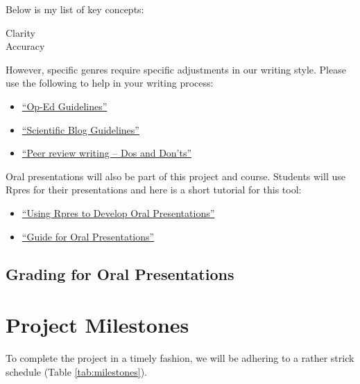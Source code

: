 \documentclass{article}\usepackage[]{graphicx}\usepackage[]{color}
\begin{document}
Below is my list of key concepts:

\begin{description}
  \item[Clarity]
  \item[Accuracy]
\end{description}


However, specific genres require specific adjustments in our writing style. Please use the following to help in your writing process:

\begin{itemize}
  \item \href{https://github.com/marclos/Climate_Change_Narratives/raw/master/Writing_Resources/Op-Ed_Guidelines.pdf}{``Op-Ed Guidelines''}
  \item \href{https://github.com/marclos/Climate_Change_Narratives/raw/master/Writing_Resources/Scientific_Blog_Guidelines.pdf}{``Scientific Blog Guidelines''}
  \item \href{https://github.com/marclos/Climate_Change_Narratives/raw/master/Writing_Resources/Peer_Review-Dos_and_Donts.pdf}{``Peer review writing -- Dos and Don'ts''}
\end{itemize}

Oral presentations will also be part of this project and course. Students will use Rpres for their presentations and here is a short tutorial for this tool:

\begin{itemize}
  \item \href{https://github.com/marclos/Climate_Change_Narratives/raw/master/Writing_Resources/TBD.pdf}{``Using Rpres to Develop Oral Presentations''}
  \item \href{https://github.com/marclos/Climate_Change_Narratives/raw/master/Writing_Resources/TBD.pdf}{``Guide for Oral Presentations''}
\end{itemize}

\subsection{Grading for Oral Presentations}


\section{Project Milestones}

To complete the project in a timely fashion, we will be adhering to a rather strick schedule (Table \ref{tab:milestones}).
\end{document}
